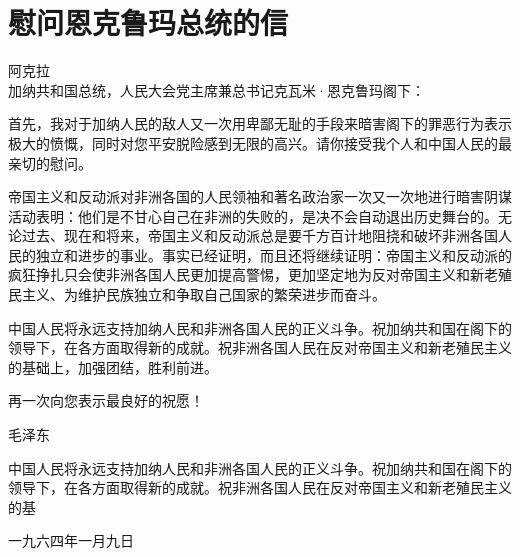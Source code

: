 \section[慰问恩克鲁玛总统的信（一九六四年一月九日）]{慰问恩克鲁玛总统的信}

{\noindent
阿克拉\\
加纳共和国总统，人民大会党主席兼总书记克瓦米·恩克鲁玛阁下：}

首先，我对于加纳人民的敌人又一次用卑鄙无耻的手段来暗害阁下的罪恶行为表示极大的愤慨，同时对您平安脱险感到无限的高兴。请你接受我个人和中国人民的最亲切的慰问。

帝国主义和反动派对非洲各国的人民领袖和著名政治家一次又一次地进行暗害阴谋活动表明：他们是不甘心自己在非洲的失败的，是决不会自动退出历史舞台的。无论过去、现在和将来，帝国主义和反动派总是要千方百计地阻挠和破坏非洲各国人民的独立和进步的事业。事实已经证明，而且还将继续证明：帝国主义和反动派的疯狂挣扎只会使非洲各国人民更加提高警惕，更加坚定地为反对帝国主义和新老殖民主义、为维护民族独立和争取自己国家的繁荣进步而奋斗。

中国人民将永远支持加纳人民和非洲各国人民的正义斗争。祝加纳共和国在阁下的领导下，在各方面取得新的成就。祝非洲各国人民在反对帝国主义和新老殖民主义的基础上，加强团结，胜利前进。

再一次向您表示最良好的祝愿！

{\hspace{0.55\linewidth}\large\kaishu{} 毛泽东}


中国人民将永远支持加纳人民和非洲各国人民的正义斗争。祝加纳共和国在阁下的领导下，在各方面取得新的成就。祝非洲各国人民在反对帝国主义和新老殖民主义的基




{\raggedleft 一九六四年一月九日 \hspace{2em} \par}
